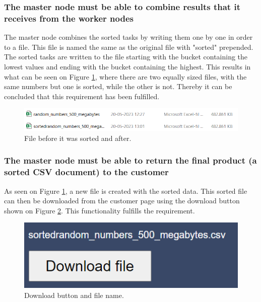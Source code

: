 \subsubsection{The master node must be able to combine results that it receives from the worker nodes}
The master node combines the sorted tasks by writing them one by one in order to a file. This file is named the same as the original file with "sorted" prepended. The sorted tasks are written to the file starting with the bucket containing the lowest values and ending with the bucket containing the highest. This results in what can be seen on Figure \ref{fig:fileSaved}, where there are two equally sized files, with the same numbers but one is sorted, while the other is not. Thereby it can be concluded that this requirement has been fulfilled. 


\begin{figure}[H]
    \centering
    \includegraphics[scale=1]{figures/fileSaved.png}
    \caption{File before it was sorted and after.}
    \label{fig:fileSaved}
\end{figure}

\subsubsection{The master node must be able to return the final product (a sorted CSV document) to the customer}
As seen on Figure \ref{fig:fileSaved}, a new file is created with the sorted data. This sorted file can then be downloaded from the customer page using the download button shown on Figure \ref{fig:downloadFile}. This functionality fulfills the requirement.

\begin{figure}[H]
    \centering
    \includegraphics[scale=1]{figures/downloadFile.png}
    \caption{Download button and file name.}
    \label{fig:downloadFile}
\end{figure}

